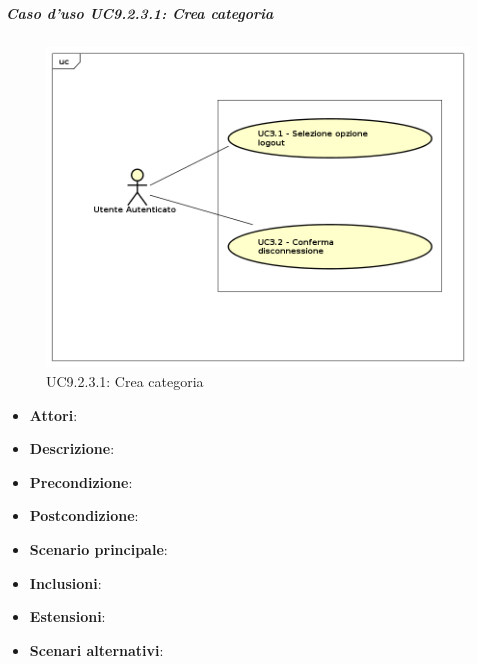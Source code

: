 			\subparagraph{Caso d'uso UC9.2.3.1: Crea categoria}
			\label{UC9.2.3.1}
			\begin{figure}[h]
				\centering
			\includegraphics[scale=0.7,keepaspectratio]{UML/UC9.png}
				\caption{UC9.2.3.1: Crea categoria}
			\end{figure}
			\FloatBarrier
			\begin{itemize}
				\item \textbf{Attori}: 
				\item \textbf{Descrizione}: 
				\item \textbf{Precondizione}: 
				\item \textbf{Postcondizione}: 
				\item \textbf{Scenario principale}:
				\item \textbf{Inclusioni}:
				\item \textbf{Estensioni}:
				\item \textbf{Scenari alternativi}:
			\end{itemize}
			
